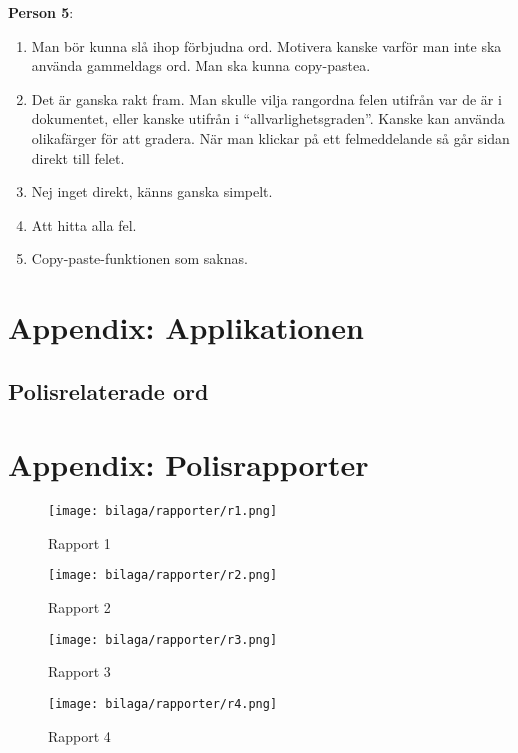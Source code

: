 \textbf{Person 5}:
\begin{enumerate}
\item Man bör kunna slå ihop förbjudna ord. Motivera kanske varför man inte ska använda gammeldags ord. Man ska kunna copy-pastea.
\item Det är ganska rakt fram. Man skulle vilja rangordna felen utifrån var de är i dokumentet, eller kanske utifrån i “allvarlighetsgraden”. Kanske kan använda olikafärger för att gradera. När man klickar på ett felmeddelande så går sidan direkt till felet.
\item Nej inget direkt, känns ganska simpelt.
\item Att hitta alla fel.
\item Copy-paste-funktionen som saknas.
\end{enumerate}

\section{Appendix: Applikationen}

\subsection{Polisrelaterade ord}

\section{Appendix: Polisrapporter}\label{b:rapporter}

\begin{figure}[H]
  \centering
  \texttt{[image: bilaga/rapporter/r1.png]}
  \caption{Rapport 1}
\end{figure}

\begin{figure}[H]
  \centering
  \texttt{[image: bilaga/rapporter/r2.png]}
  \caption{Rapport 2}
\end{figure}

\begin{figure}[H]
  \centering
  \texttt{[image: bilaga/rapporter/r3.png]}
  \caption{Rapport 3}
\end{figure}

\begin{figure}[H]
  \centering
  \texttt{[image: bilaga/rapporter/r4.png]}
  \caption{Rapport 4}
\end{figure}

